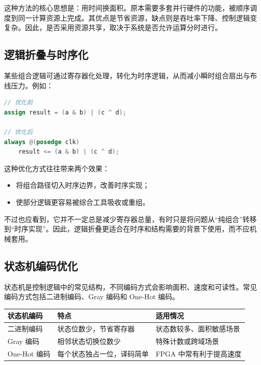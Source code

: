 这种方法的核心思想是：用时间换面积。原本需要多套并行硬件的功能，被顺序调度到同一计算资源上完成。其优点是节省资源，缺点则是吞吐率下降、控制逻辑变复杂。因此，是否采用资源共享，取决于系统是否允许运算分时进行。

\subsection{逻辑折叠与时序化}\label{ux903bux8f91ux6298ux53e0ux4e0eux65f6ux5e8fux5316}

某些组合逻辑可通过寄存器化处理，转化为时序逻辑，从而减小瞬时组合扇出与布线压力。例如：

\begin{lstlisting}[language=Verilog]
// 优化前
assign result = (a & b) | (c ^ d);

// 优化后
always @(posedge clk)
    result <= (a & b) | (c ^ d);
\end{lstlisting}

这种优化方式往往带来两个效果：

\begin{itemize}
\tightlist
\item
  将组合路径切入时序边界，改善时序实现；
\item
  使部分逻辑更容易被综合工具吸收或重组。
\end{itemize}

不过也应看到，它并不一定总是减少寄存器总量，有时只是将问题从``纯组合''转移到``时序实现''。因此，逻辑折叠更适合在时序和结构需要的背景下使用，而不应机械套用。

\subsection{状态机编码优化}\label{ux72b6ux6001ux673aux7f16ux7801ux4f18ux5316}

状态机是控制逻辑中的常见结构，不同编码方式会影响面积、速度和可读性。常见编码方式包括二进制编码、Gray
编码和 One-Hot 编码。

\begin{longtable}[]{@{}lll@{}}
\toprule\noalign{}
状态机编码 & 特点 & 适用情况 \\
\midrule\noalign{}
\endhead
\bottomrule\noalign{}
\endlastfoot
二进制编码 & 状态位数少，节省寄存器 & 状态数较多、面积敏感场景 \\
Gray 编码 & 相邻状态切换位数少 & 特殊计数或跨域场景 \\
One-Hot 编码 & 每个状态独占一位，译码简单 & FPGA 中常有利于提高速度 \\
\end{longtable}


